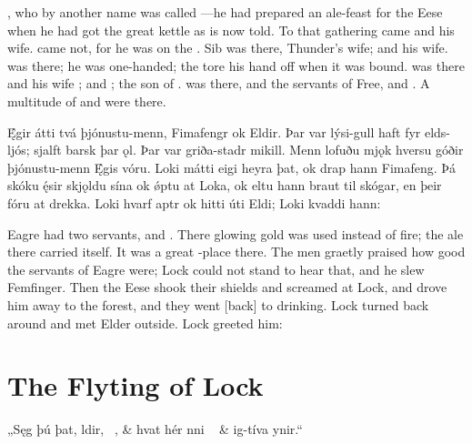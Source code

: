 \bpb {}, who by another name was called —he had prepared an ale-feast for the Eese when he had got the great kettle as is now told. To that gathering came  and  his wife.  came not, for he was on the . Sib was there, Thunder’s wife;  and  his wife.  was there; he was one-handed; the  tore his hand off when it was bound.  was there and his wife ;  and ;  the son of .  was there, and the servants of Free,  and . A multitude of  and  were there.\epb\epg


\bpg\bpa Ę́gir átti tvá þjónustu-menn, Fimafengr ok Eldir. Þar var lýsi-gull haft fyr elds-ljós; sjalft barsk þar ǫl. Þar var griða-stadr mikill. Menn lofuðu mjǫk hversu góðir þjónustu-menn Ę́gis vóru. Loki mátti eigi heyra þat, ok drap hann Fimafeng. Þá skóku ę́sir skjǫldu sína ok ǿptu at Loka, ok eltu hann braut til skógar, en þeir fóru at drekka. Loki hvarf aptr ok hitti úti Eldi; Loki kvaddi hann:\epa

\bpb Eagre had two servants,  and . There glowing gold was used instead of fire; the ale there carried itself. It was a great -place there. The men graetly praised how good the servants of Eagre were; Lock could not stand to hear that, and he slew Femfinger. Then the Eese shook their shields and screamed at Lock, and drove him away to the forest, and they went [back] to drinking. Lock turned back around and met Elder outside. Lock greeted him:\epb\epg

\sectionline

\section{The Flyting of Lock}

\bvg\bva „Sęg þú þat, ldir, \hld\ , &
hvat hér nni \hld\  &
\ind {}ig-tíva ynir.“\eva

